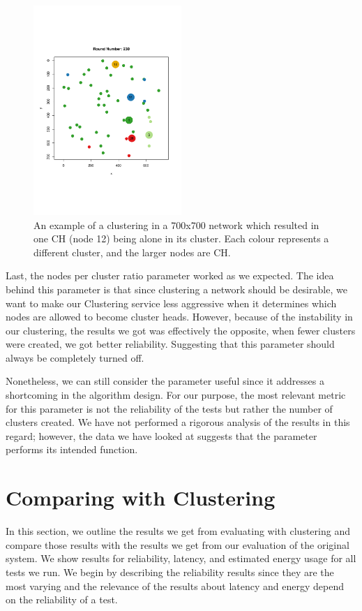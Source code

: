 \begin{figure}[bt]
    \centering
    \includegraphics[width=0.5\textwidth]{figure/Results/Discussion/MinNodeCountExample.pdf}
    \caption{An example of a clustering in a 700x700 network which resulted in one CH (node 12) being alone in its cluster. Each colour represents a different cluster, and the larger nodes are CH.}
    \label{fig:min-node-count-example}
\end{figure}

Last, the nodes per cluster ratio parameter worked as we expected. The idea behind this parameter is that since clustering a network should be desirable, we want to make our Clustering service less aggressive when it determines which nodes are allowed to become cluster heads. However, because of the instability in our clustering, the results we got was effectively the opposite, when fewer clusters were created, we got better reliability. Suggesting that this parameter should always be completely turned off.

Nonetheless, we can still consider the parameter useful since it addresses a shortcoming in the algorithm design. For our purpose, the most relevant metric for this parameter is not the reliability of the tests but rather the number of clusters created. We have not performed a rigorous analysis of the results in this regard; however, the data we have looked at suggests that the parameter performs its intended function.



\section{Comparing \atwo{} with Clustering}
In this section, we outline the results we get from evaluating \atwo{} with clustering and compare those results with the results we get from our evaluation of the original \atwo{} system. We show results for reliability, latency, and estimated energy usage for all tests we run. We begin by describing the reliability results since they are the most varying and the relevance of the results about latency and energy depend on the reliability of a test.

